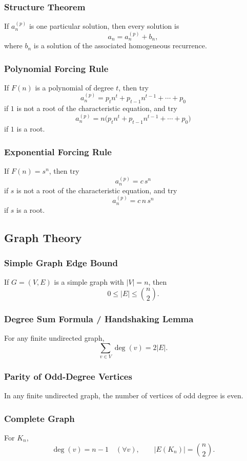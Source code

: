 \documentclass[12pt]{article}
\begin{document}
\subsubsection{Structure Theorem}
If \(a_n^{(p)}\) is one particular solution, then every solution is
\[
a_n=a_n^{(p)}+b_n,
\]
where \(b_n\) is a solution of the associated homogeneous recurrence.

\subsubsection{Polynomial Forcing Rule}
If \(F(n)\) is a polynomial of degree \(t\), then try
\[
a_n^{(p)}=p_tn^t+p_{t-1}n^{t-1}+\cdots+p_0
\]
if \(1\) is not a root of the characteristic equation, and try
\[
a_n^{(p)}=n\bigl(p_tn^t+p_{t-1}n^{t-1}+\cdots+p_0\bigr)
\]
if \(1\) is a root.

\subsubsection{Exponential Forcing Rule}
If \(F(n)=s^n\), then try
\[
a_n^{(p)}=c\,s^n
\]
if \(s\) is not a root of the characteristic equation, and try
\[
a_n^{(p)}=c\,n\,s^n
\]
if \(s\) is a root.

\subsection{Graph Theory}

\subsubsection{Simple Graph Edge Bound}
If \(G=(V,E)\) is a simple graph with \(|V|=n\), then
\[
0\le |E|\le \binom{n}{2}.
\]

\subsubsection{Degree Sum Formula / Handshaking Lemma}
For any finite undirected graph,
\[
\sum_{v\in V}\deg(v)=2|E|.
\]

\subsubsection{Parity of Odd-Degree Vertices}
In any finite undirected graph, the number of vertices of odd degree is even.

\subsubsection{Complete Graph}
For \(K_n\),
\[
\deg(v)=n-1 \quad (\forall v),
\qquad
|E(K_n)|=\binom{n}{2}.
\]
\end{document}
